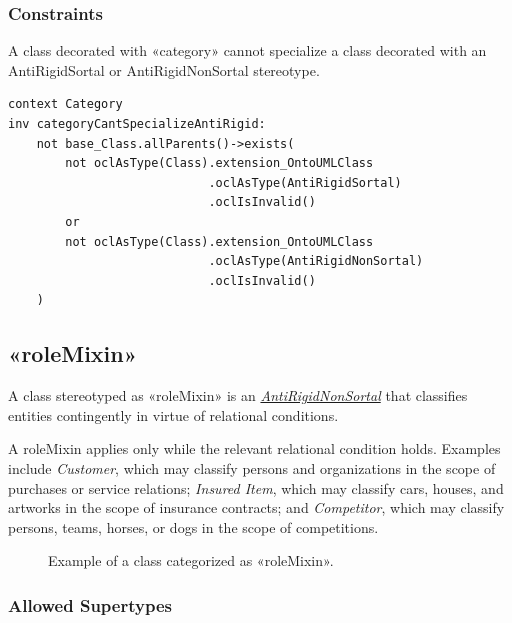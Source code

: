 \subsubsection{Constraints}

\begin{constraint}
\label{categoryCantSpecializeAntiRigid}

A class decorated with «category» cannot specialize a class decorated with an AntiRigidSortal or AntiRigidNonSortal stereotype.

\begin{lstlisting}[language=OCL]
context Category 
inv categoryCantSpecializeAntiRigid:
    not base_Class.allParents()->exists(
        not oclAsType(Class).extension_OntoUMLClass
                            .oclAsType(AntiRigidSortal)
                            .oclIsInvalid()
        or
        not oclAsType(Class).extension_OntoUMLClass
                            .oclAsType(AntiRigidNonSortal)
                            .oclIsInvalid()
    )
\end{lstlisting}
\end{constraint}



\subsection{«roleMixin»}
\label{stereotype:roleMixin}

A class stereotyped as «roleMixin» is an \hyperref[stereotype:antiRigidNonSortal]{\textit{AntiRigidNonSortal}} that classifies entities contingently in virtue of relational conditions.

A roleMixin applies only while the relevant relational condition holds. Examples include \textit{Customer}, which may classify persons and organizations in the scope of purchases or service relations; \textit{Insured Item}, which may classify cars, houses, and artworks in the scope of insurance contracts; and \textit{Competitor}, which may classify persons, teams, horses, or dogs in the scope of competitions.


\begin{figure}[h]
    \centering
    
    \caption{Example of a class categorized as «roleMixin».}
    \label{fig:roleMixin-example}
\end{figure}


\subsubsection{Allowed Supertypes}

